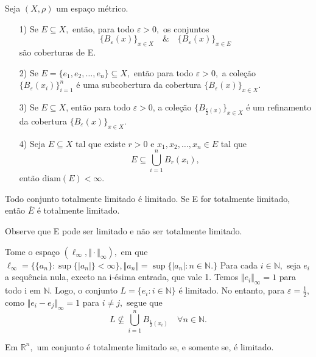 \documentclass[MetricSpaces/metric_notes.tex]{subfiles}
\begin{document}
\begin{example}
	Seja \((X, \rho )\) um espaço métrico.
	\begin{itemize}
		\item[1)] Se \(E\subseteq{X},\) então, para todo \(\varepsilon >0,\) os conjuntos
		      \[
			      \{B_{\varepsilon }(x)\}_{x\in X}\quad\&\quad \{B_{\varepsilon }(x)\}_{x\in E}
		      \]
		      são coberturas de E.
		\item[2)] Se \(E = \{e_{1}, e_{2}, \dotsc, e_{n}\}\subseteq{X},\) então para todo \(\varepsilon >0,\) a coleção \(\{B_{\varepsilon }(x_{i})\}_{i=1}^{n}\) é uma subcobertura
		      da cobertura \(\{B_{\varepsilon }(x)\}_{x\in X}\).
		\item[3)] Se \(E\subseteq{X}\), então para todo \(\varepsilon >0\), a coleção \(\{B_{\frac{\varepsilon }{2}(x)}\}_{x\in X}\) é um refinamento da cobertura \(\{B_{\varepsilon }(x)\}_{x\in X}\).
		\item[4)] Seja \(E\subseteq{X}\) tal que existe \(r > 0\) e \(x_{1}, x_{2}, \dotsc, x_{n}\in E\) tal que
		      \[
			      E\subseteq{\bigcup_{i=1}^{n}{B_{r}(x_{i})}},
		      \]
		      então \(\mathrm{diam}(E) < \infty.\)
	\end{itemize}
\end{example}
\begin{prop*}
	Todo conjunto totalmente limitado é limitado. Se E for totalmente limitado, então \(\overline{E}\) é totalmente limitado.
\end{prop*}
Observe que E pode ser limitado e não ser totalmente limitado.
\begin{example}
	Tome o espaço \((\ell_{\infty}, \Vert \cdot  \Vert_{\infty}),\) em que \(\ell_{\infty}=\{\{a_{n}\}: \sup\{|a_{n}|\} < \infty\}, \Vert a_{n} \Vert = \sup\{|a_{n}|:n\in \mathbb{N}.\}\)
	Para cada \(i\in \mathbb{N},\) seja \(e_{i}\) a sequência nula, exceto na i-ésima entrada, que vale 1. Temos \(\Vert e_{i} \Vert_{\infty} = 1\) para todo i em \(\mathbb{N}.\) Logo,
	o conjunto \(L = \{e_{i}:i\in \mathbb{N}\}\) é limitado. No entanto, para \(\varepsilon = \frac{1}{2},\) como \(\Vert e_{i}-e_{j} \Vert_{\infty} = 1\) para \(i\neq j,\)
	segue que
	\[
		L\not\subseteq{\bigcup_{i=1}^{n}{B_{\frac{1}{2}(x_{i})}}}\quad \forall n\in \mathbb{N}.
	\]
\end{example}
\begin{example}[Exercício]
	Em \(\mathbb{R}^{n},\) um conjunto é totalmente limitado se, e somente se, é limitado.
\end{example}
\end{document}
